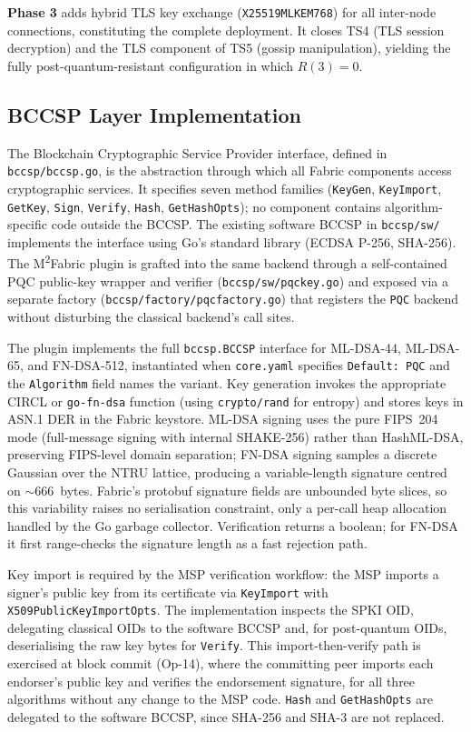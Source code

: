 \documentclass{ieeetj}
\newcommand{\mfabric}{M\textsuperscript{2}Fabric}
\begin{document}
\textbf{Phase 3} adds hybrid TLS key exchange (\texttt{X25519MLKEM768}) for all
inter-node connections, constituting the complete deployment. It closes TS4
(TLS session decryption) and the TLS component of TS5 (gossip manipulation),
yielding the fully post-quantum-resistant configuration in which $R(3)=0$.

\subsection{BCCSP Layer Implementation}
\label{sec:method_bccsp}

The Blockchain Cryptographic Service Provider interface, defined in
\texttt{bccsp/bccsp.go}, is the abstraction through which all Fabric components
access cryptographic services. It specifies seven method families
(\texttt{KeyGen}, \texttt{KeyImport}, \texttt{GetKey}, \texttt{Sign},
\texttt{Verify}, \texttt{Hash}, \texttt{GetHashOpts}); no component contains
algorithm-specific code outside the BCCSP. The existing software BCCSP in
\texttt{bccsp/sw/} implements the interface using Go's standard library (ECDSA
P-256, SHA-256). The \mfabric{} plugin is grafted into the same backend through
a self-contained PQC public-key wrapper and verifier
(\texttt{bccsp/sw/pqckey.go}) and exposed via a separate factory
(\texttt{bccsp/factory/pqcfactory.go}) that registers the \texttt{PQC} backend
without disturbing the classical backend's call sites.

The plugin implements the full \texttt{bccsp.BCCSP} interface for ML-DSA-44,
ML-DSA-65, and FN-DSA-512, instantiated when \texttt{core.yaml} specifies
\texttt{Default: PQC} and the \texttt{Algorithm} field names the variant. Key
generation invokes the appropriate CIRCL or \texttt{go-fn-dsa} function (using
\texttt{crypto/rand} for entropy) and stores keys in ASN.1 DER in the Fabric
keystore. ML-DSA signing uses the pure FIPS~204 mode (full-message signing with
internal SHAKE-256) rather than HashML-DSA, preserving FIPS-level domain
separation; FN-DSA signing samples a discrete Gaussian over the NTRU lattice,
producing a variable-length signature centred on $\sim$666~bytes. Fabric's
protobuf signature fields are unbounded byte slices, so this variability raises
no serialisation constraint, only a per-call heap allocation handled by the Go
garbage collector. Verification returns a boolean; for FN-DSA it first
range-checks the signature length as a fast rejection path.

Key import is required by the MSP verification workflow: the MSP imports a
signer's public key from its certificate via \texttt{KeyImport} with
\texttt{X509PublicKeyImportOpts}. The implementation inspects the SPKI OID,
delegating classical OIDs to the software BCCSP and, for post-quantum OIDs,
deserialising the raw key bytes for \texttt{Verify}. This import-then-verify path
is exercised at block commit (Op-14), where the committing peer imports each
endorser's public key and verifies the endorsement signature, for all three
algorithms without any change to the MSP code. \texttt{Hash} and
\texttt{GetHashOpts} are delegated to the software BCCSP, since SHA-256 and SHA-3
are not replaced.
\end{document}
